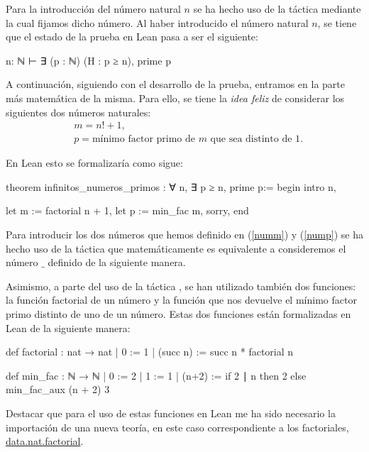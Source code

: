 Para la introducción del número natural \(n\) se ha hecho uso de la
táctica  mediante la cual fijamos dicho número. Al
haber introducido el número natural \(n\), se tiene que el estado de la
prueba en Lean pasa a ser el siguiente:
\begin{leancode}
n: ℕ
⊢ ∃ (p : ℕ) (H : p ≥ n), prime p
\end{leancode}

A continuación, siguiendo con el desarrollo de la prueba, entramos en la
parte más matemática de la misma. Para ello, se tiene la \textit{idea
feliz} de considerar los siguientes dos números naturales:
\begin{align}
  &m = n!+1,\label{numm}\\
  &p = \text{mínimo factor primo de \(m\) que sea distinto de 1}.\label{nump}
\end{align}

En Lean esto se formalizaría como sigue:
\begin{leancode}
theorem infinitos_numeros_primos : ∀ n, ∃ p ≥ n, prime p:=
begin
  intro n,

  let m := factorial n + 1,
  let p := min_fac m,
  sorry,
end
\end{leancode}

Para introducir los dos números que hemos definido en (\ref{numm}) y
(\ref{nump}) se ha hecho uso de la táctica  que
matemáticamente es equivalente a consideremos el número \(\_\) definido
de la siguiente manera.

Asimismo, a parte del uso de la táctica , se han
utilizado también dos funciones: la función factorial de un número y la
función que nos devuelve el mínimo factor primo distinto de uno de un
número. Estas dos funciones están formalizadas en Lean de la siguiente
manera:
\begin{leancode}
def factorial : nat → nat
  | 0        := 1
  | (succ n) := succ n * factorial n

def min_fac : ℕ → ℕ
  | 0 := 2
  | 1 := 1
  | (n+2) := if 2 ∣ n then 2 else min_fac_aux (n + 2) 3
\end{leancode}


Destacar que para el uso de estas funciones en Lean me ha sido necesario
la importación de una nueva teoría, en este caso correspondiente a los
factoriales,
\href{https://github.com/leanprover-community/mathlib/blob/master/src/data/nat/factorial.lean}{data.nat.factorial}.


